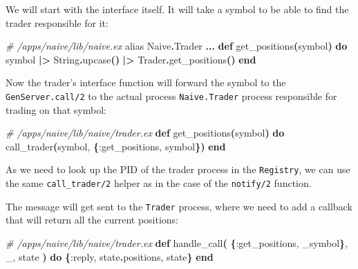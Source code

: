\documentclass[
  oneside]{book}
\newenvironment{Shaded}{\begin{snugshade}}{\end{snugshade}}
\newcommand{\CommentTok}[1]{\textcolor[rgb]{0.56,0.35,0.01}{\textit{#1}}}
\newcommand{\ConstantTok}[1]{\textcolor[rgb]{0.56,0.35,0.01}{#1}}
\newcommand{\FunctionTok}[1]{\textcolor[rgb]{0.13,0.29,0.53}{\textbf{#1}}}
\newcommand{\ImportTok}[1]{#1}
\newcommand{\KeywordTok}[1]{\textcolor[rgb]{0.13,0.29,0.53}{\textbf{#1}}}
\newcommand{\NormalTok}[1]{#1}
\newcommand{\OperatorTok}[1]{\textcolor[rgb]{0.81,0.36,0.00}{\textbf{#1}}}
\newcommand{\VariableTok}[1]{\textcolor[rgb]{0.00,0.00,0.00}{#1}}
\begin{document}
We will start with the interface itself. It will take a symbol to be able to find the trader responsible for it:

\begin{Shaded}
\begin{Highlighting}[]
  \CommentTok{\# /apps/naive/lib/naive.ex}
  \ImportTok{alias} \ConstantTok{Naive}\OperatorTok{.}\ConstantTok{Trader}
  \OperatorTok{...}
  \KeywordTok{def}\NormalTok{ get\_positions}\FunctionTok{(}\NormalTok{symbol}\FunctionTok{)} \KeywordTok{do}
\NormalTok{    symbol}
    \OperatorTok{|\textgreater{}} \ConstantTok{String}\OperatorTok{.}\NormalTok{upcase}\FunctionTok{()}
    \OperatorTok{|\textgreater{}} \ConstantTok{Trader}\OperatorTok{.}\NormalTok{get\_positions}\FunctionTok{()}
  \KeywordTok{end}
\end{Highlighting}
\end{Shaded}

Now the trader's interface function will forward the symbol to the \texttt{GenServer.call/2} to the actual process \texttt{Naive.Trader} process responsible for trading on that symbol:

\begin{Shaded}
\begin{Highlighting}[]
  \CommentTok{\# /apps/naive/lib/naive/trader.ex}
  \KeywordTok{def}\NormalTok{ get\_positions}\FunctionTok{(}\NormalTok{symbol}\FunctionTok{)} \KeywordTok{do}
\NormalTok{    call\_trader}\FunctionTok{(}\NormalTok{symbol, }\FunctionTok{\{}\VariableTok{:get\_positions}\NormalTok{, symbol}\FunctionTok{\})}
  \KeywordTok{end}
\end{Highlighting}
\end{Shaded}

As we need to look up the PID of the trader process in the \texttt{Registry}, we can use the same \texttt{call\_trader/2} helper as in the case of the \texttt{notify/2} function.

The message will get sent to the \texttt{Trader} process, where we need to add a callback that will return all the current positions:

\begin{Shaded}
\begin{Highlighting}[]
  \CommentTok{\# /apps/naive/lib/naive/trader.ex}
  \KeywordTok{def}\NormalTok{ handle\_call}\FunctionTok{(}
        \FunctionTok{\{}\VariableTok{:get\_positions}\NormalTok{, \_symbol}\FunctionTok{\}}\NormalTok{,}
\NormalTok{        \_,}
\NormalTok{        state}
      \FunctionTok{)} \KeywordTok{do}
    \FunctionTok{\{}\VariableTok{:reply}\NormalTok{, state}\OperatorTok{.}\NormalTok{positions, state}\FunctionTok{\}}
  \KeywordTok{end}
\end{Highlighting}
\end{Shaded}
\end{document}
